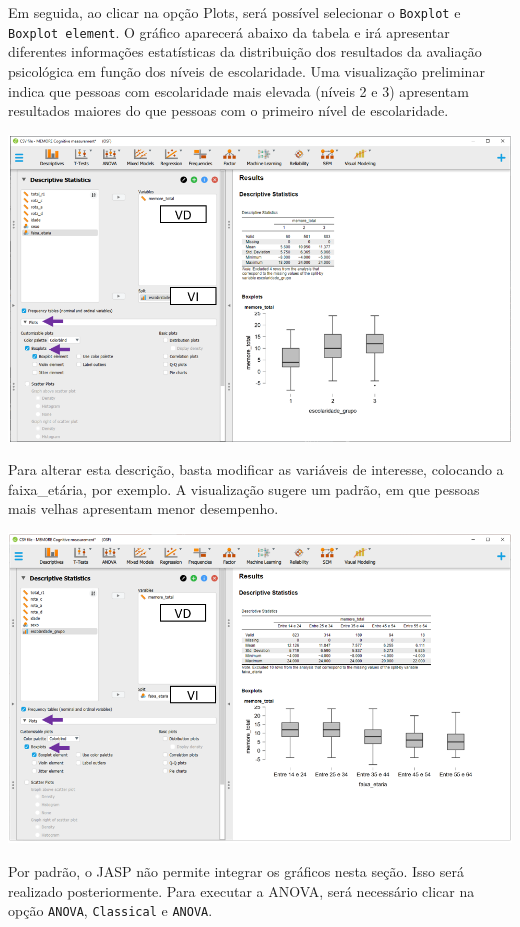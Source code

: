 \documentclass[
]{book}
\begin{document}
Em seguida, ao clicar na opção Plots, será possível selecionar o \texttt{Boxplot} e \texttt{Boxplot\ element}. O gráfico aparecerá abaixo da tabela e irá apresentar diferentes informações estatísticas da distribuição dos resultados da avaliação psicológica em função dos níveis de escolaridade. Uma visualização preliminar indica que pessoas com escolaridade mais elevada (níveis 2 e 3) apresentam resultados maiores do que pessoas com o primeiro nível de escolaridade.

\includegraphics{./img/cap_anova_two_way_plot.png}

Para alterar esta descrição, basta modificar as variáveis de interesse, colocando a faixa\_etária, por exemplo. A visualização sugere um padrão, em que pessoas mais velhas apresentam menor desempenho.

\includegraphics{./img/cap_anova_two_way_plot1.png}

Por padrão, o JASP não permite integrar os gráficos nesta seção. Isso será realizado posteriormente. Para executar a ANOVA, será necessário clicar na opção \texttt{ANOVA}, \texttt{Classical} e \texttt{ANOVA}.
\end{document}
